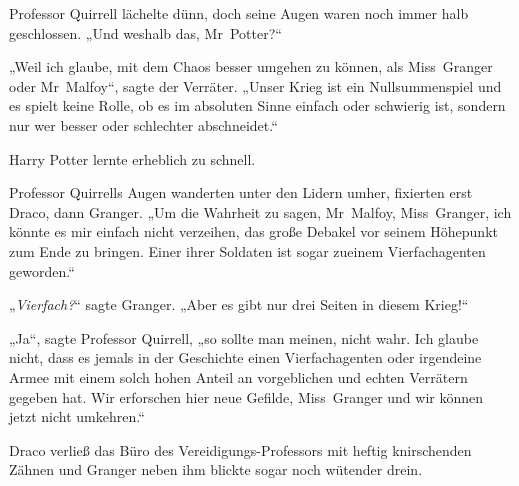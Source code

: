Professor Quirrell lächelte dünn, doch seine Augen waren noch immer halb geschlossen. „Und weshalb das, Mr~Potter?“

„Weil ich glaube, mit dem Chaos besser umgehen zu können, als Miss~Granger oder Mr~Malfoy“, sagte der Verräter. „Unser Krieg ist ein Nullsummenspiel und es spielt keine Rolle, ob es im absoluten Sinne einfach oder schwierig ist, sondern nur wer besser oder schlechter abschneidet.“

Harry Potter lernte erheblich zu schnell.

Professor Quirrells Augen wanderten unter den Lidern umher, fixierten erst Draco, dann Granger. „Um die Wahrheit zu sagen, Mr~Malfoy, Miss~Granger, ich könnte es mir einfach nicht verzeihen, das große Debakel vor seinem Höhepunkt zum Ende zu bringen. Einer ihrer Soldaten ist sogar zueinem Vierfachagenten geworden.“

„\emph{Vierfach?}“ sagte Granger. „Aber es gibt nur drei Seiten in diesem Krieg!“

„Ja“, sagte Professor Quirrell, „so sollte man meinen, nicht wahr. Ich glaube nicht, dass es jemals in der Geschichte einen Vierfachagenten oder irgendeine Armee mit einem solch hohen Anteil an vorgeblichen und echten Verrätern gegeben hat. Wir erforschen hier neue Gefilde, Miss~Granger und wir können jetzt nicht umkehren.“

Draco verließ das Büro des Vereidigungs-Professors mit heftig knirschenden Zähnen und Granger neben ihm blickte sogar noch wütender drein.


